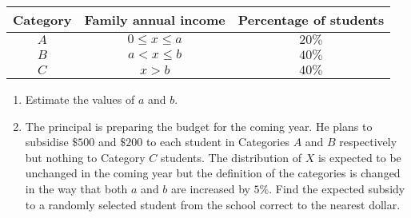 \documentclass[letterpaper,10pt,addpoints]{exam}
\begin{document}
\begin{questions}
\begin{tabular}{|c|c|c|}
\hline Category & Family annual income & Percentage of students \\
\hline$A$ & $0 \leq x \leq a$ & $20 \%$ \\
\hline$B$ & $a<x \leq b$ & $40 \%$ \\
\hline$C$ & $x>b$ & $40 \%$ \\
\hline
\end{tabular}

\begin{enumerate}
  \item Estimate the values of $a$ and $b$.
  \item The principal is preparing the budget for the coming year. He plans to subsidise $\$ 500$ and $\$ 200$ to each student in Categories $A$ and $B$ respectively but nothing to Category $C$ students. The distribution of $X$ is expected to be unchanged in the coming year but the definition of the categories is changed in the way that both $a$ and $b$ are increased by $5 \%$. Find the expected subsidy to a randomly selected student from the school correct to the nearest dollar.
\end{enumerate}






\end{questions}
\end{document}
